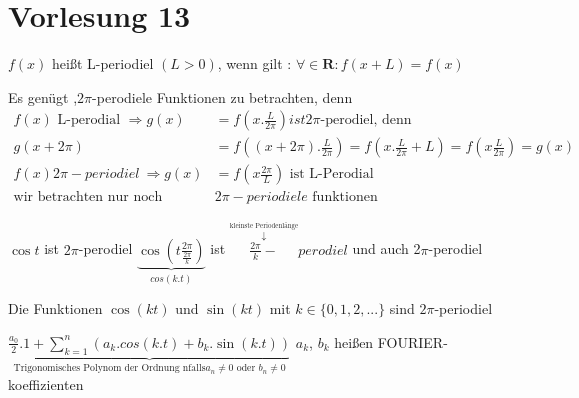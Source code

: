 \section{Vorlesung 13}
\begin{definition}[L-periodial]
	$f(x)$ heißt L-periodiel $(L>0)$, wenn gilt : $\forall \in \mathbf{R}: f(x+L)=f(x)$
\end{definition}
\begin{remark}
	Es genügt ,$2\pi$-perodiele Funktionen zu betrachten, denn 
\begin{align*}
f(x) \text{ L-perodial }\Rightarrow  g(x)&= f(x.\frac{L}{2\pi}) ist 2\pi\text{-perodiel, denn }\\
								g(x+2\pi)&= f((x+2\pi).\frac{L}{2\pi})= f(x.\frac{L}{2\pi}+L)=f(x\frac{L}{2\pi})=g(x)\\
f(x)  2\pi-periodiel \ \Rightarrow g(x)&= f(x\frac{2\pi}{L})\text{ ist L-Perodial}\\
\text{wir betrachten nur noch }& 2\pi-periodiele\text{ funktionen}
\end{align*}
\end{remark}
\begin{example}
	$\cos t$ ist $2\pi$-perodiel  
	$\underbrace{\cos(t\frac{2\pi}{\frac{2\pi}{k}})}_{cos(k.t)}$ ist 
	$\overset{\overset{\text{kleinste Periodenlänge}}{\downarrow}}{\frac{2\pi}{k}-}perodiel$ und auch 2$\pi$-perodiel\\
\end{example}
\begin{remark}
Die Funktionen $\cos(kt)$ und $\sin(kt)$ mit $k\in \{ 0,1,2,... \}   $ sind $2\pi$-periodiel\\ 
\end{remark}
\begin{remark}
$\underbrace{\frac{a_0}{2}.1+\sum_{k=1}^{n}(a_k.cos(k.t)+b_k.\sin(k.t))}_{\text{Trigonomisches Polynom der Ordnung nfalls} a_n \neq 0\text{ oder }b_n \neq 0}$
$a_k$, $b_k$ heißen FOURIER-koeffizienten
\end{remark}
 
